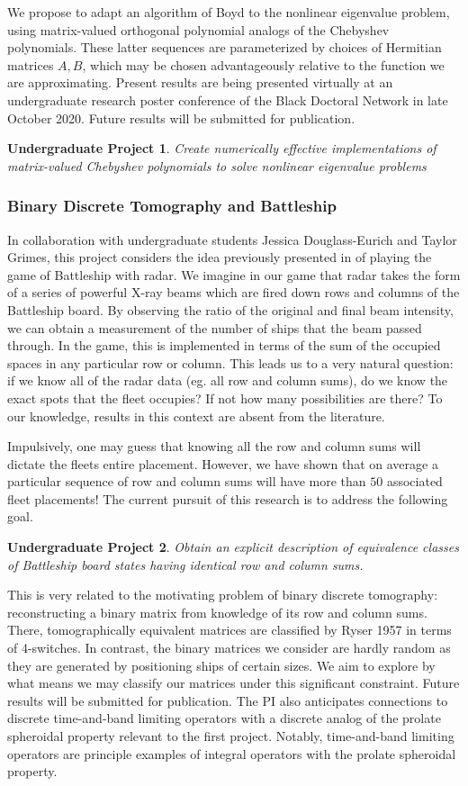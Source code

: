 \documentclass[11pt,letterpaper]{article}
\newtheorem{ugoal}{Undergraduate Project}
\theoremstyle{definition}
\begin{document}
We propose to adapt an algorithm of Boyd \cite{boyd} to the nonlinear eigenvalue problem, using matrix-valued orthogonal polynomial analogs of the Chebyshev polynomials.
These latter sequences are parameterized by choices of Hermitian matrices $A,B$, which may be chosen advantageously relative to the function we are approximating.
Present results are being presented virtually at an undergraduate research poster conference of the Black Doctoral Network in late October 2020.
Future results will be submitted for publication.
\begin{ugoal}
Create numerically effective implementations of matrix-valued Chebyshev polynomials to solve nonlinear eigenvalue problems
\end{ugoal}

\subsubsection*{Binary Discrete Tomography and Battleship}
In collaboration with undergraduate students Jessica Douglass-Eurich and Taylor Grimes, this project considers the idea previously presented in \cite{gritzmann} of playing the game of Battleship with radar.  We imagine in our game that radar takes the form of a series of powerful X-ray beams which are fired down rows and columns of the Battleship board.  By observing the ratio of the original and final beam intensity, we can obtain a measurement of the number of ships that the beam passed through.  In the game, this is implemented in terms of the sum of the occupied spaces in any particular row or column.  This leads us to a very natural question: if we know all of the radar data (eg. all row and column sums), do we know the exact spots that the fleet occupies?  If not how many possibilities are there?  To our knowledge, results in this context are absent from the literature.

Impulsively, one may guess that knowing all the row and column sums will dictate the fleets entire placement.  However, we have shown that on average a particular sequence of row and column sums will have more than $50$ associated fleet placements!
The current pursuit of this research is to address the following goal.
\begin{ugoal}
Obtain an explicit description of equivalence classes of Battleship board states having identical row and column sums.
\end{ugoal}
This is very related to the motivating problem of binary discrete tomography: reconstructing a binary matrix from knowledge of its row and column sums.  There, tomographically equivalent matrices are classified by Ryser 1957 in terms of 4-switches.
In contrast, the binary matrices we consider are hardly random as they are generated by positioning ships of certain sizes.  We aim to explore by what means we may classify our matrices under this significant constraint.
Future results will be submitted for publication.
The PI also anticipates connections to discrete time-and-band limiting operators with a discrete analog of the prolate spheroidal property relevant to the first project.
Notably, time-and-band limiting operators are principle examples of integral operators with the prolate spheroidal property.
\end{document}
